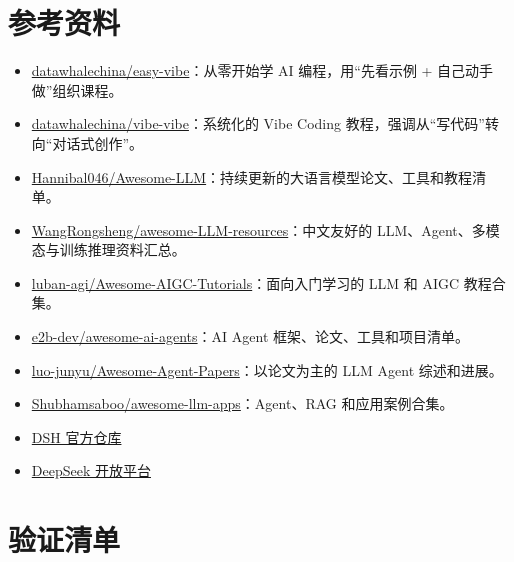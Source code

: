 \section{参考资料}\label{src-appendix-appendix4-references}

\begin{itemize}
\tightlist
\item
  \href{https://github.com/datawhalechina/easy-vibe}{datawhalechina/easy-vibe}：从零开始学
  AI 编程，用``先看示例 + 自己动手做''组织课程。
\item
  \href{https://github.com/datawhalechina/vibe-vibe}{datawhalechina/vibe-vibe}：系统化的
  Vibe Coding 教程，强调从``写代码''转向``对话式创作''。
\item
  \href{https://github.com/Hannibal046/Awesome-LLM}{Hannibal046/Awesome-LLM}：持续更新的大语言模型论文、工具和教程清单。
\item
  \href{https://github.com/WangRongsheng/awesome-LLM-resources}{WangRongsheng/awesome-LLM-resources}：中文友好的
  LLM、Agent、多模态与训练推理资料汇总。
\item
  \href{https://github.com/luban-agi/Awesome-AIGC-Tutorials}{luban-agi/Awesome-AIGC-Tutorials}：面向入门学习的
  LLM 和 AIGC 教程合集。
\item
  \href{https://github.com/e2b-dev/awesome-ai-agents}{e2b-dev/awesome-ai-agents}：AI
  Agent 框架、论文、工具和项目清单。
\item
  \href{https://github.com/luo-junyu/Awesome-Agent-Papers}{luo-junyu/Awesome-Agent-Papers}：以论文为主的
  LLM Agent 综述和进展。
\item
  \href{https://github.com/Shubhamsaboo/awesome-llm-apps}{Shubhamsaboo/awesome-llm-apps}：Agent、RAG
  和应用案例合集。
\item
  \href{https://github.com/deepseek-ai/deepseek-harness}{DSH 官方仓库}
\item
  \href{https://platform.deepseek.com/}{DeepSeek 开放平台}
\end{itemize}

\section{验证清单}\label{src-appendix-appendix4-validation}

